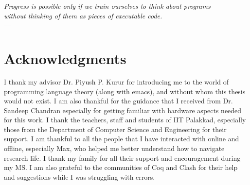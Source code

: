 
\begin{flushright}{\slshape
   Progress is possible only if we train ourselves to think about programs\\
   without thinking of them as pieces of executable code.
} \\ \medskip
    ---  \citep{dijkstra2000pursuit}
\end{flushright}



\bigskip

\begingroup
\let\clearpage\relax
\let\cleardoublepage\relax
\let\cleardoublepage\relax
\chapter*{Acknowledgments}
I thank my advisor Dr. Piyush P. Kurur for introducing me to the world
of programming language theory (along with emacs), and without whom
this thesis would not exist.
I am also thankful for the guidance that I received from
Dr. Sandeep Chandran especially for getting familiar with hardware
aspects needed for this work.
I thank the teachers, staff and students of IIT Palakkad, especially
those from the Department of Computer Science and Engineering for
their support.
I am thankful to all the people that I have interacted with online and
offline, especially Max, who helped me better understand how to navigate
research life.
I thank my family for all their support and encouragement during my MS.
I am also grateful to the communities of Coq and Clash for their help
and suggestions while I was struggling with errors.

\endgroup
